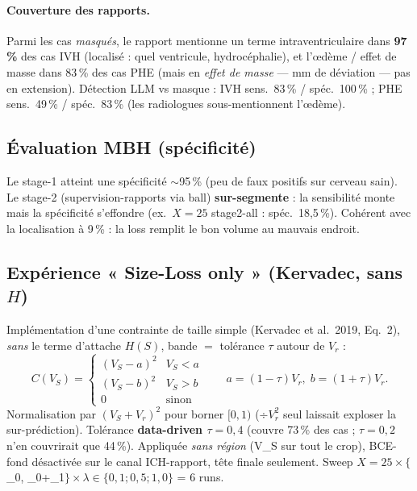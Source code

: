 \documentclass[11pt,a4paper]{article}
\begin{document}
\paragraph{Couverture des rapports.} Parmi les cas \emph{masqués}, le rapport mentionne un
terme intraventriculaire dans \textbf{97\,\%} des cas IVH (localisé : quel ventricule,
hydrocéphalie), et l'\oe dème / effet de masse dans 83\,\% des cas PHE (mais en \emph{effet
de masse} --- mm de déviation --- pas en extension). Détection LLM vs masque : IVH
sens.\ 83\,\% / spéc.\ 100\,\% ; PHE sens.\ 49\,\% / spéc.\ 83\,\% (les radiologues
sous-mentionnent l'\oe dème).

\subsection{Évaluation MBH (spécificité)}
Le stage-1 atteint une spécificité $\sim$95\,\% (peu de faux positifs sur cerveau sain).
Le stage-2 (supervision-rapports via ball) \textbf{sur-segmente} : la sensibilité monte mais
la spécificité s'effondre (ex.\ $X{=}25$ stage2-all : spéc.\ 18,5\,\%). Cohérent avec la
localisation à 9\,\% : la loss remplit le bon volume au mauvais endroit.

\subsection{Expérience « Size-Loss only » (Kervadec, sans $H$)}
\label{sec:size}
Implémentation d'une contrainte de taille simple (Kervadec et al.\ 2019, Eq.~2), \emph{sans}
le terme d'attache $H(S)$, bande $=$ tolérance $\tau$ autour de $V_r$ :
\[
C(V_S)=\begin{cases}(V_S-a)^2 & V_S<a\\(V_S-b)^2 & V_S>b\\0 & \text{sinon}\end{cases}
\qquad a=(1-\tau)V_r,\; b=(1+\tau)V_r .
\]
Normalisation par $(V_S+V_r)^2$ pour borner $[0,1)$ (÷$V_r^2$ seul laissait exploser la
sur-prédiction). Tolérance \textbf{data-driven $\tau=0{,}4$} (couvre 73\,\% des cas ; $\tau=0{,}2$
n'en couvrirait que 44\,\%). Appliquée \emph{sans région} (V\_S sur tout le crop), BCE-fond
désactivée sur le canal ICH-rapport, tête finale seulement. Sweep $X{=}25 \times
\{$\_0, \_0+\_1$\} \times \lambda\in\{0{,}1;0{,}5;1{,}0\}$ = 6 runs.
\end{document}
